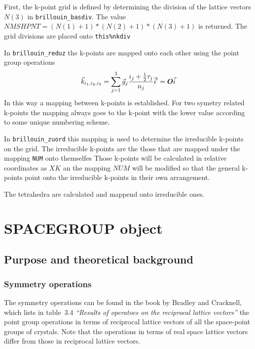 \documentclass[11pt,a4paper]{report}
\begin{document}
First, the k-point grid is defined by determining the division of the
lattice vectors $N(3)$ in \verb|brillouin_basdiv|. The value
$NMSHPNT=(N(1)+1)*(N(2)+1)*(N(3)+1)$ is returned. The grid divisions
are placed onto \verb|this%nkdiv|

In \verb|brillouin_reduz| the k-points are mapped onto each other
using the point group operations
\begin{eqnarray}
\vec{k}_{i_1,i_2,i_3}=\sum_{j=1}^3 \vec{g}_{j}\frac{i_{j}+\frac{1}{2}\tau_j}{n_{j}}
\nonumber
\vec{i}'=\bm{O}\vec{i}
\end{eqnarray}
In this way a mapping 
between k-points is established. For two symetry
related k-points the mapping always goes to the k-point with the lower
value according to some unique numbering scheme.

In \verb|brillouin_zuord| this mapping is used to determine the
irreducible k-points on the grid. The irreducible k-points are the
those that are mapped under the mapping \verb|NUM| onto themselfes
Those k-points will be calculated in relative coordinates as $XK$ an
the mapping $NUM$ will be modified so that the general k-points point
onto the irreducible k-points in their own arrangement.

The tetrahedra are calculated and mappend onto irreducible ones.

\chapter{SPACEGROUP object}
\section{Purpose and theoretical background}
\subsection{Symmetry operations}
The symmetry operations can be found in the book by Bradley and
Cracknell\cite{bradley72_book}, which lists in table~3.4
\textit{``Results of operatoes on the reciprocal lattice vectors''}
the point group operations in terms of reciprocal lattice vectors of
all the space-point groups of crystals. Note that the operations in
terms of real space lattice vectors differ from those in reciprocal
lattice vectors.
\end{document}
